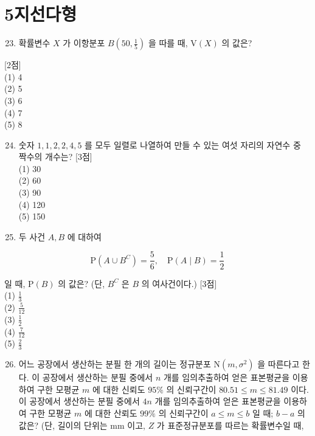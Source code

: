 \documentclass[10pt]{article}
\begin{document}
\section*{5지선다형}
\begin{enumerate}
  \setcounter{enumi}{22}
  \item 확률변수 \(X\) 가 이항분포 \(B\left(50, \frac{1}{5}\right)\) 을 따를 때, \(\mathrm{V}(X)\) 의 값은?
\end{enumerate}

[2점]\\
(1) 4\\
(2) 5\\
(3) 6\\
(4) 7\\
(5) 8

\begin{enumerate}
  \setcounter{enumi}{23}
  \item 숫자 \(1,1,2,2,4,5\) 를 모두 일렬로 나열하여 만들 수 있는 여섯 자리의 자연수 중 짝수의 개수는? [3점]\\
(1) 30\\
(2) 60\\
(3) 90\\
(4) 120\\
(5) 150

  \item 두 사건 \(A, B\) 에 대하여

\end{enumerate}

\[
\mathrm{P}\left(A \cup B^{C}\right)=\frac{5}{6}, \quad \mathrm{P}(A \mid B)=\frac{1}{2}
\]

일 때, \(\mathrm{P}(B)\) 의 값은? (단, \(B^{C}\) 은 \(B\) 의 여사건이다.) [3점]\\
(1) \(\frac{1}{3}\)\\
(2) \(\frac{5}{12}\)\\
(3) \(\frac{1}{2}\)\\
(4) \(\frac{7}{12}\)\\
(5) \(\frac{2}{3}\)

\begin{enumerate}
  \setcounter{enumi}{25}
  \item 어느 공장에서 생산하는 분필 한 개의 길이는 정규분포 \(\mathrm{N}\left(m, \sigma^{2}\right)\) 을 따른다고 한다. 이 공장에서 생산하는 분필 중에서 \(n\) 개를 임의추출하여 얻은 표본평균을 이용하여 구한 모평균 \(m\) 에 대한 신뢰도 \(95 \%\) 의 신뢰구간이 \(80.51 \leq m \leq 81.49\) 이다. 이 공장에서 생산하는 분필 중에서 \(4 n\) 개를 임의추출하여 얻은 표본평균을 이용하여 구한 모평균 \(m\) 에 대한 산뢰도 \(99 \%\) 의 신뢰구간이 \(a \leq m \leq b\) 일 때; \(b-a\) 의 값은? (단, 길이의 단위는 mm 이고, \(Z\) 가 표준정규분포를 따르는 확률변수일 때,
\end{enumerate}
\end{document}

